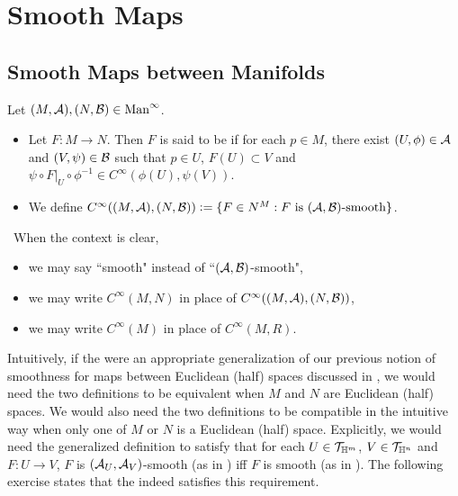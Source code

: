 \documentclass{book}
\begin{document}
\newpage 
\chapter{Smooth Maps}

\section{Smooth Maps between Manifolds}

\begin{defn} 
	Let $(M, \mathcal{A}), (N, \mathcal{B}) \in \text{Man}^{\infty}$.
	\begin{itemize}
		\item Let $F: M \rightarrow N$. Then $F$ is said to be  if for each $p \in M$, there exist $(U, \phi) \in \mathcal{A}$ and $(V, \psi) \in \mathcal{B}$ such that $p \in U$, $F(U) \subset V$ and $\psi \circ F|_U \circ \phi^{-1} \in C^{\infty}(\phi(U), \psi(V))$. 
		\item We define $C^{\infty}((M, \mathcal{A}), (N, \mathcal{B})) \vcentcolon= \{F \in N^M: \text{$F$ is $(\mathcal{A}, \mathcal{B})$-smooth}\}$.
	\end{itemize}
\end{defn}

\begin{note}\
	When the context is clear, 
	\begin{itemize}
		\item we may say ``smooth" instead of ``$(\mathcal{A}, \mathcal{B})$-smooth",
		\item we may write $C^{\infty}(M,N)$ in place of $C^{\infty}((M, \mathcal{A}), (N, \mathcal{B}))$,
		\item we may write $C^{\infty}(M)$ in place of $C^{\infty}(M, R)$.
	\end{itemize} 
\end{note}

Intuitively, if the  were an appropriate generalization of our previous notion of smoothness for maps between Euclidean (half) spaces discussed in , we would need the two definitions to be equivalent when $M$ and $N$ are Euclidean (half) spaces. We would also need the two definitions to be compatible in the  intuitive way when only one of $M$ or $N$ is a Euclidean (half) space. Explicitly, we would need the generalized definition to satisfy that for each $U \in \mathcal{T}_{\mathbb{H}^m}$, $V \in \mathcal{T}_{\mathbb{H}^n}$ and $F:U \rightarrow V$, $F$ is $(\mathcal{A}_U, \mathcal{A}_V)$-smooth (as in ) iff $F$ is smooth (as in ). The following exercise states that the  indeed satisfies this requirement. 
\end{document}
